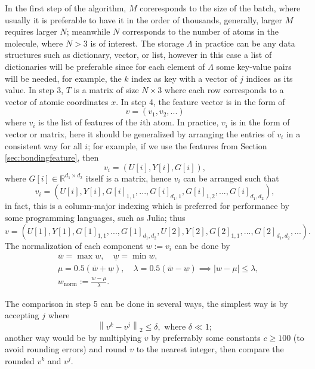 \documentclass[12pt]{article}
\begin{document}
In the first step of the algorithm, $M$ coreresponds to the size of the batch, where usually it is preferable to have it in the order of thousands, generally, larger $M$ requires larger $N$; meanwhile $N$ corresponds to the number of atoms in the molecule, where $N > 3$ is of interest.
The storage $\Lambda$ in practice can be any data structures such as dictionary, vector, or list, however in this case a list of dictionaries will be preferable since for each element of $\Lambda$ some key-value pairs will be needed, for example, the $k$ index as key with a vector of $j$ indices as its value.
In step 3, $T$ is a matrix of size $N \times 3$ where each row corresponds to a vector of atomic coordinates $x$.
In step 4, the feature vector is in the form of 
\begin{equation*}
    v = (v_1, v_2, ...)
\end{equation*}
where $v_i$ is the list of features of the $i$th atom. In practice, $v_i$ is in the form of vector or matrix, here it should be generalized by arranging the entries of $v_i$ in a consistent way for all $i$;
for example, if we use the features from Section \ref{sec:bondingfeature}, then
\begin{equation*}
    v_i = (U[i], Y[i], G[i]),
\end{equation*}
where $G[i] \in \mathbb{R}^{d_1 \times d_2}$ itself is a matrix, hence $v_i$ can be arranged such that
\begin{equation*}
    v_i = (U[i], Y[i], G[i]_{1,1},..., G[i]_{d_1,1}, G[i]_{1,2},...,  G[i]_{d_1,d_2}),
\end{equation*}
in fact, this is a column-major indexing which is preferred for performance by some programming languages, such as Julia;
thus
\begin{equation*}
    v = (U[1], Y[1], G[1]_{1,1},..., G[1]_{d_1,d_2}, U[2], Y[2], G[2]_{1,1},..., G[2]_{d_1,d_2}, ...).
\end{equation*}
The normalization of each component $w := v_i $ can be done by
\begin{equation}
    \begin{split}
        &\overline{w} = \max w, \quad \underline{w} = \min w, \\
        &\mu = 0.5(\overline{w} + \underline{w}), \quad \lambda = 0.5(\overline{w} - \underline{w}) \implies |w - \mu|\leq \lambda, \\
        &w_\text{norm} := \frac{w - \mu}{\lambda}.
    \end{split}
\end{equation}

The comparison in step 5 can be done in several ways, the simplest way is by accepting $j$ where
\begin{equation*}
    \left\| v^k - v^j\right\|_2 \leq \delta, \text{ where } \delta \ll 1;
\end{equation*}
another way would be by multiplying $v$ by preferrably some constants $c \geq 100$ (to avoid rounding errors) and round $v$ to the nearest integer, then compare the rounded $v^k$ and $v^j$.
\end{document}
